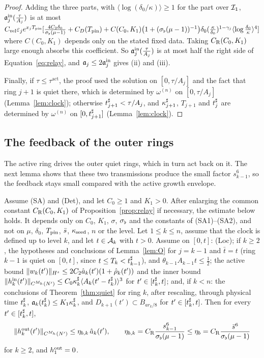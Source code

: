 \begin{proof}
Adding the three parts, with $\langle\log(\delta_0/\kappa)\rangle\ge1$ for the
part over $\mathcal{I}_1$, $\mathfrak{a}^{\mathrm{in}}_j(\frac{\tau}{A_j})$ is at most
$C_{\mathrm{vel}} \varepsilon_je^{x_jT_{\mathrm{pin}}}[\frac{4C_2\delta_0}{\sigma_\flat(\mu-1)}+C_D(T_{\mathrm{pin}})
+C(C_0,K_1)\big(1+(\sigma_\flat(\mu-1))^{-1}\big)\delta_0(\frac\kappa{\delta_0})^{1-\gamma_j}\langle\log\frac{\delta_0}\kappa\rangle^4]$
where $C(C_0,K_1)$ depends only on the stated fixed data. Taking
$C_{\mathrm R}(C_0,K_1)$ large enough absorbs this coefficient.
So $\mathfrak{a}^{\mathrm{in}}_j(\frac{\tau}{A_j})$ is at most half the right side of
Equation~\eqref{eq:relay}, and $\mathfrak{a}_j\le2\mathfrak{a}^{\mathrm{in}}_j$ gives (ii) and (iii).

Finally, if $\tau\le\tau^{\mathrm{act}}$, the proof used the solution on
$[0,\tau/A_j]$ and the fact that ring $j+1$ is quiet there, which is determined by
$\omega^{(n)}$ on $[0,\tau/A_j]$ (Lemma~\ref{lem:clock}); otherwise
$t^\sharp_{j+1}<\tau/A_j$, and $\kappa^\sharp_{j+1}$, $T_{j+1}$ and $t^\sharp_j$ are determined by
$\omega^{(n)}$ on $[0,t^\sharp_{j+1}]$ (Lemma~\ref{lem:clock}).
\end{proof}

\subsection{The feedback of the outer rings}
\label{sec:proof-Oprime}

The active ring drives the outer quiet rings, which in turn act back on it.
The next lemma shows that these two transmissions produce the small factor
$s_{k-1}^6$, so the feedback stays small compared with the active growth envelope.

\begin{lemma}
\label{lem:Oprime}
Assume (SA) and (Det), and let $C_0\ge1$ and $K_1>0$.
After enlarging the common constant $C_{\mathrm R}(C_0,K_1)$ of
Proposition~\ref{prop:relay} if necessary, the estimate below holds. It
depends only on $C_0$, $K_1$, $\sigma$, $\sigma_\flat$ and the constants of
(SA1)--(SA2), and not on $\mu$,
$\delta_0$, $T_{\mathrm{pin}}$, $\bar s$, $\kappa_{\mathrm{seed}}$, $n$ or the level. Let $1\le k\le n$, assume
that the clock is defined up to level $k$, and let $t\in\mathcal{A}_k$ with $t>0$. Assume on
$[0,t]$: \textup{(Loc)}; if $k\ge2$, the hypotheses and conclusions of
Lemma~\ref{lem:O} for $j=k-1$ and $\bar t=t$ (ring $k-1$ is quiet on $[0,t]$,
since $t\le T_k<t^\sharp_{k-1}$), and $\theta_{k-1}A_{k-1}t\le\frac12$; the active
bound $\|w_k(t')\|_{H^s}\le2C_2\hat a_k(t')(1+\hat\rho_k(t'))$ and the inner bound
$\|h^{\mathrm{in}}_k(t')\|_{C^{M_h}(N')}\le C_0\kappa^\sharp_k\langle A_k(t'-t^\sharp_k)\rangle^3$ for
$t'\in[t^\sharp_k,t]$; and, if $k<n$: the conclusions of
Theorem~\ref{thm:quiet} for ring $k$, after rescaling, through physical time $t^\sharp_k$,
$\mathfrak{a}_k(t^\sharp_k)\le K_1\kappa^\sharp_k$, and $D_{k+1}(t')\subset B_{ar_k/8}$ for
$t'\in[t^\sharp_k,t]$. Then for every $t'\in[t^\sharp_k,t]$,
\begin{equation}
\label{eq:etab}
\|h^{\mathrm{out}}_k(t')\|_{C^{M_h}(N')}\le\eta_{b,k}\,\hat a_k(t'),\qquad
\eta_{b,k}=C_{\mathrm R}\frac{s_{k-1}^6}{\sigma_\flat(\mu-1)}\le\eta_b=C_{\mathrm R}\frac{\bar s^6}{\sigma_\flat(\mu-1)}
\end{equation}
for $k\ge2$, and $h^{\mathrm{out}}_1=0$.
\end{lemma}

